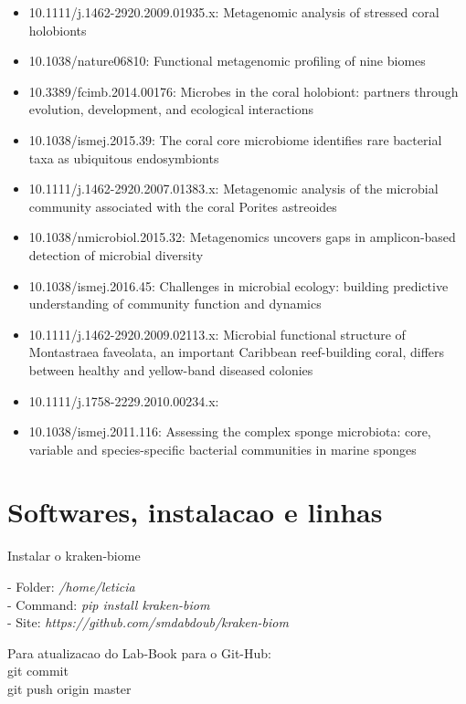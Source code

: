\documentclass[12pt, a4paper]{report}
\begin{document}
\begin{itemize}
\item 10.1111/j.1462-2920.2009.01935.x: Metagenomic analysis of stressed coral holobionts
\item 10.1038/nature06810: Functional metagenomic profiling of nine biomes
\item 10.3389/fcimb.2014.00176: Microbes in the coral holobiont: partners through evolution, development, and ecological interactions
\item 10.1038/ismej.2015.39: The coral core microbiome identifies rare bacterial
taxa as ubiquitous endosymbionts
\item 10.1111/j.1462-2920.2007.01383.x: Metagenomic analysis of the microbial community
associated with the coral Porites astreoides
\item  10.1038/nmicrobiol.2015.32: Metagenomics uncovers gaps in amplicon-based
detection of microbial diversity
\item 10.1038/ismej.2016.45: Challenges in microbial ecology: building predictive
understanding of community function and dynamics
\item 10.1111/j.1462-2920.2009.02113.x: Microbial functional structure of Montastraea faveolata,
an important Caribbean reef-building coral, differs
between healthy and yellow-band diseased colonies
\item 10.1111/j.1758-2229.2010.00234.x: 
\item 10.1038/ismej.2011.116: Assessing the complex sponge microbiota: core, variable and species-specific bacterial communities
in marine sponges
\end{itemize}

\chapter{Softwares, instalacao e linhas}

Instalar o kraken-biome

\begin{tcolorbox}[width=6.0in]
	- Folder: \textit{/home/leticia}\\
	- Command: \textit{pip install kraken-biom}\\
	- Site: \textit{https://github.com/smdabdoub/kraken-biom}
\end{tcolorbox}

Para atualizacao do Lab-Book para o Git-Hub: \\
git commit \\
git push origin master \\
\end{document}
